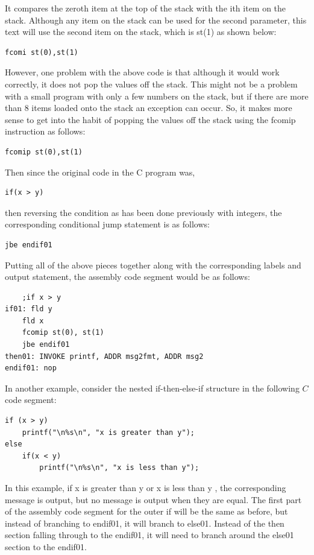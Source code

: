 \documentclass[10pt]{book}
\begin{document}
It compares the zeroth item at the top of the stack with the ith item on the stack. Although any item on the stack can be used for the second parameter, this text will use the second item on the stack, which is st(1) as shown below:

\begin{verbatim}
fcomi st(0),st(1)
\end{verbatim}

However, one problem with the above code is that although it would work correctly, it does not pop the values off the stack. This might not be a problem with a small program with only a few numbers on the stack, but if there are more than 8 items loaded onto the stack an exception can occur. So, it makes more sense to get into the habit of popping the values off the stack using the fcomip instruction as follows:
\begin{verbatim}
fcomip st(0),st(1)
\end{verbatim}

Then since the original code in the C program was,

\begin{verbatim}
if(x > y)
\end{verbatim}

then reversing the condition as has been done previously with integers, the corresponding conditional jump statement is as follows:

\begin{verbatim}
jbe endif01
\end{verbatim}

Putting all of the above pieces together along with the corresponding labels and output statement, the assembly code segment would be as follows:

\begin{verbatim}
    ;if x > y
if01: fld y
    fld x
    fcomip st(0), st(1)
    jbe endif01
then01: INVOKE printf, ADDR msg2fmt, ADDR msg2
endif01: nop
\end{verbatim}

In another example, consider the nested if-then-else-if structure in the following $C$ code segment:

\begin{verbatim}
if (x > y)
    printf("\n%s\n", "x is greater than y");
else
    if(x < y)
        printf("\n%s\n", "x is less than y");
\end{verbatim}

In this example, if x is greater than y or x is less than y , the corresponding message is output, but no message is output when they are equal. The first part of the assembly code segment for the outer if will be the same as before, but instead of branching to endif01, it will branch to else01. Instead of the then section falling through to the endif01, it will need to branch around the else01 section to the endif01.
\end{document}

